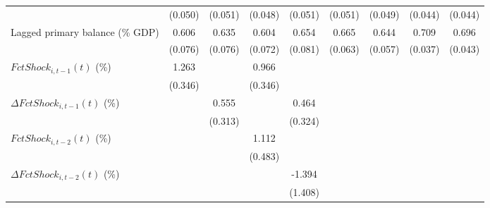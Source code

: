 {\begin{tabular}{l*{8}{c}}
                    &     (0.050)         &     (0.051)         &     (0.048)         &     (0.051)         &     (0.051)         &     (0.049)         &     (0.044)         &     (0.044)         \\
\addlinespace
Lagged primary balance (\% GDP)&       0.606\sym{***}&       0.635\sym{***}&       0.604\sym{***}&       0.654\sym{***}&       0.665\sym{***}&       0.644\sym{***}&       0.709\sym{***}&       0.696\sym{***}\\
                    &     (0.076)         &     (0.076)         &     (0.072)         &     (0.081)         &     (0.063)         &     (0.057)         &     (0.037)         &     (0.043)         \\
\addlinespace
$ FctShock_{i,t-1}(t)$ (\%)&       1.263\sym{***}&                     &       0.966\sym{**} &                     &                     &                     &                     &                     \\
                    &     (0.346)         &                     &     (0.346)         &                     &                     &                     &                     &                     \\
\addlinespace
$ \Delta FctShock_{i,t-1}(t)$ (\%)&                     &       0.555\sym{*}  &                     &       0.464         &                     &                     &                     &                     \\
                    &                     &     (0.313)         &                     &     (0.324)         &                     &                     &                     &                     \\
\addlinespace
$ FctShock_{i,t-2}(t)$ (\%)&                     &                     &       1.112\sym{**} &                     &                     &                     &                     &                     \\
                    &                     &                     &     (0.483)         &                     &                     &                     &                     &                     \\
\addlinespace
$ \Delta FctShock_{i,t-2}(t)$ (\%)&                     &                     &                     &      -1.394         &                     &                     &                     &                     \\
                    &                     &                     &                     &     (1.408)         &                     &                     &                     &                     \\

\end{tabular}}
